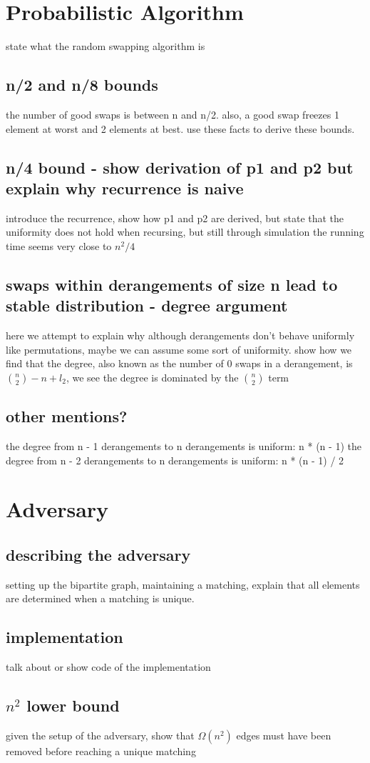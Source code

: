 \documentclass{article}
\begin{document}
\section{Probabilistic Algorithm}
state what the random swapping algorithm is
\subsection{n/2 and n/8 bounds}
the number of good swaps is between n and n/2. also, a good swap freezes 1 element 
at worst and 2 elements at best. use these facts to derive these bounds.
\subsection{n/4 bound - show derivation of p1 and p2 but explain why recurrence is naive}
introduce the recurrence, show how p1 and p2 are derived, but state that the uniformity
does not hold when recursing, but still through simulation the running time seems very close to $n^2/4$
\subsection{swaps within derangements of size n lead to stable distribution - degree argument}
here we attempt to explain why although derangements don't behave uniformly
like permutations, maybe we can assume some sort of uniformity. 
show how we find that the
degree, also known as the number of 0 swaps in a derangement, is ${n \choose 2} - n + l_2 $, 
we see the degree is dominated by the ${n \choose 2}$ term
\subsection{other mentions?}
the degree from n - 1 derangements to n derangements is uniform: n * (n - 1)
the degree from n - 2 derangements to n derangements is uniform: n * (n - 1) / 2

\section{Adversary}
\subsection{describing the adversary}
setting up the bipartite graph, maintaining a matching, explain that all elements
are determined when a matching is unique.
\subsection{implementation}
talk about or show code of the implementation
\subsection{$n^2$ lower bound}
given the setup of the adversary, show that $\Omega(n^2)$ edges must have been removed 
before reaching a unique matching
\end{document}
